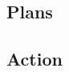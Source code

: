 \documentclass[
11pt,
titlepage,
reqno,
]{article}%
\theoremstyle{definition}
\begin{document}
\subsection{Plans}
%
%
%
%
%	
\subsection{Action}
\end{document}
